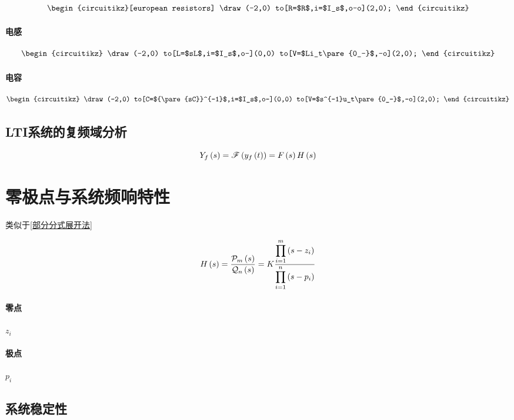 \documentclass{article}
\begin{document}
\[\begin{circuitikz}[european resistors]
        \draw(-2,0)
        to[R=$R$,i=$I_s$,o-o](2,0);
    \end{circuitikz}\]

\paragraph{电感}

\[\begin{circuitikz}
        \draw(-2,0)
        to[L=$sL$,i=$I_s$,o-](0,0)
        to[V=$Li_t\pare{0_-}$,-o](2,0);
    \end{circuitikz}\]

\paragraph{电容}

\[\begin{circuitikz}
        \draw(-2,0)
        to[C=${\pare{sC}}^{-1}$,i=$I_s$,o-](0,0)
        to[V=$s^{-1}u_t\pare{0_-}$,-o](2,0);
    \end{circuitikz}\]

\subsection{LTI系统的复频域分析}

\[Y_f\left(s\right)=\mathscr F\left(y_f\left(t\right)\right)=F\left(s\right) H\left(s\right)\]

\section{零极点与系统频响特性}

类似于\ref{部分分式展开法}

\[H\left(s\right)=\frac{\mathcal P_m\left(s\right)}{\mathcal Q_n\left(s\right)}
    =K\frac{\displaystyle\prod_{i=1}^m\left(s-z_i\right)}
    {\displaystyle\prod_{i=1}^n\left(s-p_i\right)}\]

\paragraph{零点}$z_i$

\paragraph{极点}$p_i$

\subsection{系统稳定性}
\end{document}
